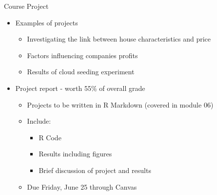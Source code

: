 \documentclass[aspectratio=169]{beamer}\usepackage[]{graphicx}\usepackage[]{color}
\begin{document}
\begin{frame}{Course Project}
\begin{itemize}
  \item Examples of projects
  \begin{itemize}
  	\item Investigating the link between house characteristics and price
  	\item Factors influencing companies profits
  	\item Results of cloud seeding experiment
  \end{itemize}
  \item Project report - worth 55\% of overall grade
  \begin{itemize}
  	\item Projects to be written in R Markdown (covered in module 06)
  	\item Include:
  	\begin{itemize}
  		\item R Code
      \item Results including figures
      \item Brief discussion of project and results
  	\end{itemize}
  	\item Due Friday, June 25 through Canvas
  \end{itemize}
\end{itemize}
\end{frame}
\end{document}

